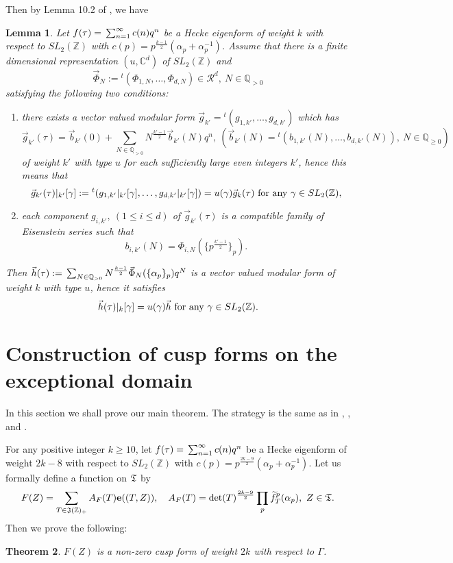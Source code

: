\documentclass[11pt]{amsart}
\numberwithin{equation}{section}
\newtheorem{theorem}{Theorem}[section]
\newtheorem{lemma}[theorem]{Lemma}
\theoremstyle{definition}
\begin{document}
Then by Lemma 10.2 of \cite{Ik2}, we have
\begin{lemma}\label{ikeda-lem} Let $f(\tau)={\displaystyle}\sum_{n=1}^\infty c(n)q^n$ be a Hecke eigenform of weight $k$ with respect to $SL_2({\mathbb{Z}})$ with 
$c(p)=p^{\frac{k-1}{2}}(\alpha_p+\alpha^{-1}_p)$. 
Assume that there is a finite dimensional representation $(u,{\mathbb{C}}^d)$ of $SL_2({\mathbb{Z}})$ and 
$$\vec{\Phi}_N:={}^t(\Phi_{1,N},\ldots,\Phi_{d,N})\in\mathcal R^d,\ N\in{\mathbb{Q}}_{>0}
$$ 
satisfying the following two conditions: 
\begin{enumerate}
\item there exists a vector valued modular form $\vec{g}_{k'}={}^t(g_{1,k'},\ldots,g_{d,k'})$ which has  
$$\vec{g}_{k'}(\tau)=\vec{b}_{k'}(0)+\sum_{N\in{\mathbb{Q}}_{>0}} N^{\frac{k'-1}{2}} \vec{b}_{k'}(N) q^n,\  (\vec{b}_{k'}(N)=
{}^t(b_{1,k'}(N),\ldots,b_{d,k'}(N)),\ N\in {\mathbb{Q}}_{\ge 0})$$ of weight $k'$ with type $u$ 
for each sufficiently large even integers $k'$, hence this means that 
$$\vec{g}_{k'}(\tau)|_{k'}[\gamma]:={}^t(g_{1,k'}|_{k'}[\gamma],\ldots,g_{d,k'}|_{k'}[\gamma])=
u(\gamma)\vec{g}_{k}(\tau)\ {\rm for\ any}\ \gamma\in SL_2({\mathbb{Z}}),
$$ 
\item each component $g_{i,k'},\ (1\le i\le d)$ of $\vec{g}_{k'}(\tau)$ is a compatible family of Eisenstein series such that $$b_{i,k'}(N)=\Phi_{i,N}(\{p^{\frac{k'-1}{2}}\}_p).
$$ 
\end{enumerate}
Then $\vec{h}(\tau):={\displaystyle}\sum_{N\in{\mathbb{Q}}_{>0}} N^{\frac{k-1}{2}} \vec{\Phi}_{N}(\{\alpha_p\}_p) q^N$ is 
a vector valued modular form of weight $k$ with type $u$, hence it satisfies 
$$\vec{h}(\tau)|_{k}[\gamma]=u(\gamma)\vec{h}\ {\rm for\ any}\ \gamma\in SL_2({\mathbb{Z}}).
$$
\end{lemma}

\section{Construction of cusp forms on the exceptional domain}\label{construction}
In this section we shall prove our main theorem. The strategy is the same as in \cite{Ik1}, \cite{Ik2}, and \cite{Yamana}. 

For any positive integer $k\ge 10$, let $f(\tau)={\displaystyle}\sum_{n=1}^\infty c(n)q^n$ be a Hecke eigenform of 
weight $2k-8$ with respect to $SL_2({\mathbb{Z}})$ with 
$c(p)=p^{\frac{2k-9}{2}}(\alpha_p+\alpha^{-1}_p)$. 
Let us formally define a function on $\frak T$ by  
$$F(Z)=\sum_{T\in \frak J({\mathbb{Z}})_+}A_F(T)\bold{e}((T,Z)),\quad 
A_F(T)=\det(T)^{\frac{2k-9}{2}} \prod_p \widetilde{f}_T^p(\alpha_p) ,\ Z\in \frak T.
$$ 
Then we prove the following:
\begin{theorem}\label{main-thm} $F(Z)$ is a non-zero cusp form of weight $2k$ with respect to $\Gamma$.
\end{theorem}
\end{document}
